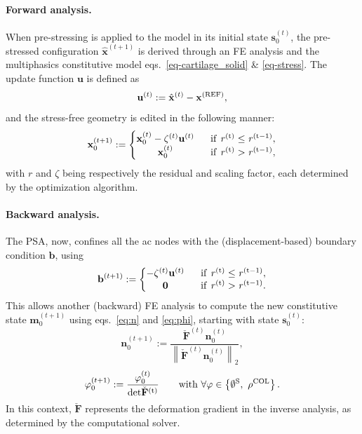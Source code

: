 \paragraph{Forward analysis.} When pre-stressing is applied to the model in its initial state $\mathbf{s}^{(t)}_0$, the pre-stressed configuration $\hat{\mathbf{x}}^{(t+1)}$ is derived through an FE analysis and the multiphasics constitutive model eqs.~\ref{eq-cartilage_solid} \& \ref{eq-stress}. The update function $\mathbf{u}$ is defined as
%
\begin{equation}
    \mathbf{u}^{(t)} := \hat{\mathbf{x}}^{(t)}-\mathbf{x}^{\rm{(REF)}},
\end{equation}
%
and the stress-free geometry is edited in the following manner:
%
\begin{equation}
    \mathbf{x}_{0}^{(t+1)} := \left\{\begin{matrix}
    \mathbf{x}_{0}^{(t)} - \zeta^{(t)} \mathbf{u}^{(t)}  & \ \ \rm{if} \ \mathit{r}^{(t)} \leq \mathit{r}^{(t-1)},\\ 
    \mathbf{x}_{0}^{(t)} & \ \ \rm{if} \ \mathit{r}^{(t)} > \mathit{r}^{(t-1)},
    \end{matrix}\right.
\end{equation}
%
with $r$ and $\zeta$ being respectively the residual and scaling factor, each determined by the optimization algorithm.

\paragraph{Backward analysis.} The PSA, now, confines all the \ac{ac} nodes with the (displacement-based) boundary condition $\mathbf{b}$, using
%
\begin{equation}
    \mathbf{b}^{(t+1)} := \left\{\begin{matrix}
     - \zeta^{(t)}\mathbf{u}^{(t)} & \ \ \rm{if} \ \mathit{r}^{(t)} \leq \mathit{r}^{(t-1)},\\ 
    \mathbf{0} & \ \ \rm{if} \ \mathit{r}^{(t)} > \mathit{r}^{(t-1)}.
    \end{matrix}\right.
\end{equation}
%
This allows another (backward) FE analysis to compute the new constitutive state $\mathbf{m}_0^{(t+1)}$ using eqs.~\ref{eq:n} and \ref{eq:phi}, starting with state $\mathbf{s}_0^{(t)}$:
%
\begin{equation}
    \mathbf{n}_{0}^{(t+1)} := \frac{\check{\mathbf{F}}^{(t)}\mathbf{n}_0^{(t)}}{\left \|\check{\mathbf{F}}^{(t)}\mathbf{n}_0^{(t)} \right \|_2},
\end{equation}
%
\begin{equation}
    \varphi_{0}^{(t+1)} := \frac{\varphi_0^{(t)}}{\rm{det}\check{\mathbf{F}}^{(t)}} 
    \qquad \text{with } \forall \varphi \in \left\{\emptyset^{\rm{S}},\ \rho^{\rm{COL}}\right\}.
\end{equation}
%
In this context, $\check{\mathbf{F}}$ represents the deformation gradient in the inverse analysis, as determined by the computational solver.

